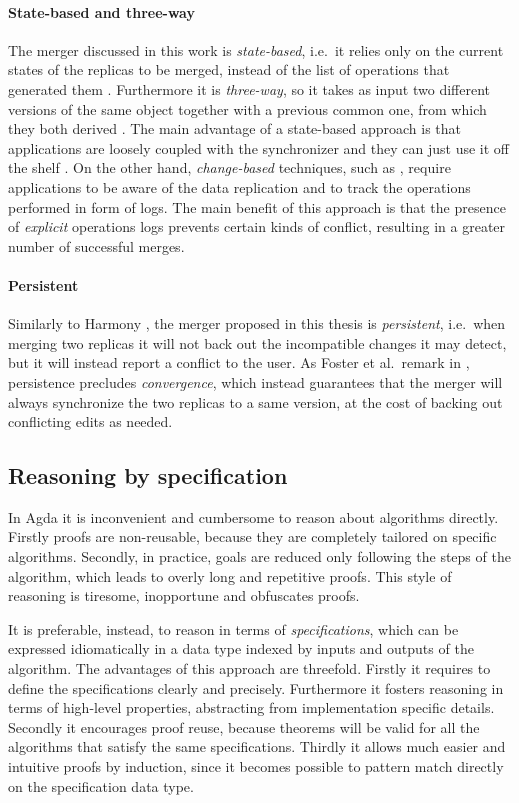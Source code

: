 \documentclass[../Thesis.tex]{subfiles}
\begin{document}
	\paragraph{State-based and three-way}
	The merger discussed in this work is \emph{state-based}, i.e.\ 
	it relies only on the current states of the replicas to be merged, instead
	of the list of operations that generated them \cite{PierceDiff3}.
	Furthermore it is \emph{three-way}, so it takes as input two different 
	versions of the same object together with a previous common one, 
	from which they both derived \cite{PierceDiff3}.	
	The main advantage of a state-based approach is that applications
	are loosely coupled with the synchronizer and they can just use it
	off the shelf \cite{PierceDiff3}.
	On the other hand, \emph{change-based} techniques, such as 
	\cite{Ramsey01}, require applications	to be aware of the data replication
	and to track the operations performed in form of logs.
	The main benefit of this approach is that the presence of \emph{explicit}
	operations logs prevents certain kinds of conflict, resulting in a
	greater number of successful merges.
		
	\paragraph{Persistent}
	Similarly to Harmony \cite{Pierce07}, the merger proposed in 
	this thesis is \emph{persistent}, i.e.\ when merging two replicas 
	it will not back out the incompatible changes it may detect, 
	but it will instead report a conflict to the user.
	As Foster et al.\ remark in \cite{Pierce07}, persistence precludes 
	\emph{convergence}, which instead guarantees that the merger
	will always synchronize the two replicas to a same version, 
	at the cost of backing out conflicting edits as needed.
	
	\subsection{Reasoning by specification}
	\label{subsec:spec}
	In Agda it is inconvenient and cumbersome to reason about algorithms directly.
	Firstly proofs are non-reusable, because they are completely tailored 
	on specific algorithms.
	Secondly, in practice,  goals are reduced only following the steps
	of the algorithm,	which leads to overly long and repetitive proofs. 
	This style of reasoning is tiresome, inopportune and obfuscates proofs.

	It is preferable, instead, to reason in terms of \emph{specifications}, which
	can be expressed idiomatically in a data type indexed by inputs
	and outputs of the algorithm. 
	The advantages of this approach are threefold.
	Firstly it requires to define the specifications clearly and precisely.
	Furthermore it fosters 	reasoning in terms of high-level properties, 
	abstracting from implementation specific details.
	Secondly it encourages proof reuse, because theorems will be valid for
	all the algorithms that satisfy the same specifications.
	Thirdly it allows much easier and intuitive proofs by induction, since it 
	becomes possible to pattern match directly on the specification data type.
	
\end{document}
